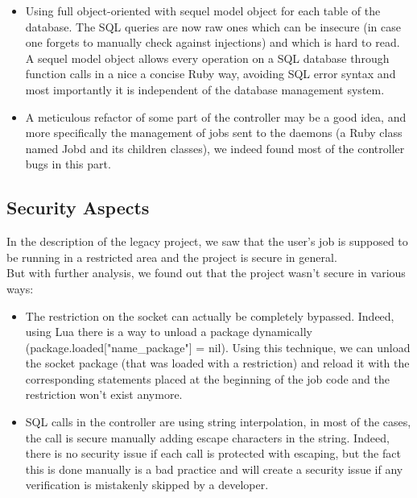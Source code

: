 \documentclass{eplmastersthesis}
\begin{document}
          \begin{itemize}
            \item Using full object-oriented with sequel \cite{Sequel} model
            object for each table of the database. The SQL queries are now
            raw ones which can be insecure (in case one forgets to manually
            check against injections) and which is hard to read.\\
            A sequel model object allows every operation on a SQL database
            through function calls in a nice a concise Ruby way, avoiding
            SQL error syntax and most importantly it is independent of the
            database management system.
            \item A meticulous refactor of some part of the controller may be
            a good idea, and more specifically the management of jobs sent to
            the daemons (a Ruby class named Jobd and its children classes), we
            indeed found most of the controller bugs in this part.
          \end{itemize}

      \subsection{Security Aspects}

        In the description of the legacy project, we saw that the user's job is
        supposed to be running in a restricted area and the project is secure in
        general.\\
        But with further analysis, we found out that the project wasn't secure
        in various ways:\\
        \begin{itemize}
          \item The restriction on the socket can actually be completely
          bypassed. Indeed, using Lua there is a way to unload a package
          dynamically (package.loaded["name\_package"] = nil). Using this
          technique, we can unload the socket package (that was loaded with a
          restriction) and reload it with the corresponding statements placed
          at the beginning of the job code and the restriction won't exist
          anymore.
          \item SQL calls in the controller are using string interpolation,
          in most of the cases, the call is secure manually adding escape
          characters in the string. Indeed, there is no security issue if
          each call is protected with escaping, but the fact this is done
          manually is a bad practice and will create a security issue if
          any verification is mistakenly skipped by a developer.
        \end{itemize}
\end{document}
